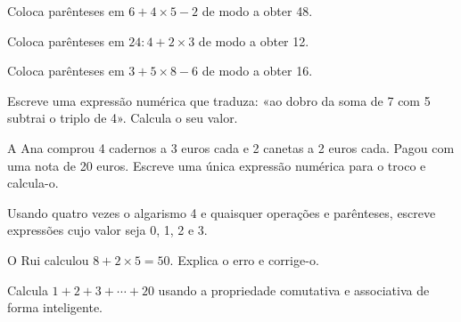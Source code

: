 \documentclass[12pt]{article}
\begin{document}
\begin{exercicios}
  \item Coloca parênteses em $6 + 4 \times 5 - 2$ de modo a obter 48.
  \item Coloca parênteses em $24 : 4 + 2 \times 3$ de modo a obter 12.
  \item Coloca parênteses em $3 + 5 \times 8 - 6$ de modo a obter 16.
  \item Escreve uma expressão numérica que traduza: «ao dobro da soma de 7 com 5 subtrai o triplo de 4». Calcula o seu valor.
  \item A Ana comprou 4 cadernos a 3 euros cada e 2 canetas a 2 euros cada. Pagou com uma nota de 20 euros. Escreve uma única expressão numérica para o troco e calcula-o.
  \item Usando quatro vezes o algarismo 4 e quaisquer operações e parênteses, escreve expressões cujo valor seja 0, 1, 2 e 3.
  \item O Rui calculou $8 + 2 \times 5 = 50$. Explica o erro e corrige-o.
  \item Calcula $1 + 2 + 3 + \cdots + 20$ usando a propriedade comutativa e associativa de forma inteligente.
\end{exercicios}
\end{document}
